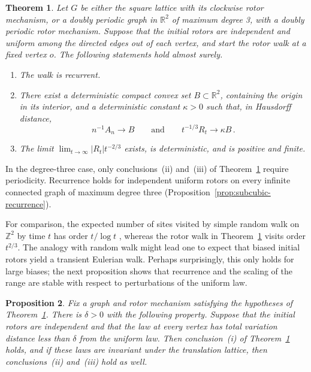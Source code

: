 \documentclass[11pt]{amsart}
\theoremstyle{plain}
\newtheorem{theorem}{Theorem}[section]
\newtheorem{proposition}[theorem]{Proposition}
\theoremstyle{definition}
\newcommand{\Z}{\mathbb Z}
\newcommand{\R}{\mathbb R}
\begin{document}
	\begin{theorem}\label{thm:main}
		Let $G$ be either the square lattice with its clockwise rotor mechanism, or
		a doubly periodic graph in $\R^2$ of maximum degree 3, with a doubly periodic rotor
		mechanism.  Suppose that the initial rotors are independent and uniform among
		the directed edges out of each vertex, and start the rotor walk at a fixed vertex
		$o$.  The following statements hold almost surely.
		
		\begin{enumerate}[label=\textup{(\roman*)}]
			\item The walk is recurrent.
			
			\item There exist a deterministic compact convex set
			$B\subset\R^2$, containing the origin in its interior, and a
			deterministic constant $\kappa>0$ such that, in Hausdorff distance,
			\[
			n^{-1}A_n\longrightarrow B
			\qquad\text{and}\qquad
			t^{-1/3}R_t\longrightarrow\kappa B\, .
			\]
			
			\item The limit $\lim_{t\to\infty}|R_t|t^{-2/3}$ exists, is deterministic,
			and is positive and finite.
		\end{enumerate}
	\end{theorem}
	
	In the degree-three case, only conclusions~\textup{(ii)}
	and~\textup{(iii)} of Theorem~\ref{thm:main} require periodicity.  Recurrence holds for independent uniform rotors on every
	infinite connected graph of maximum degree three
	(Proposition~\ref{prop:subcubic-recurrence}).
	
	For comparison, the expected number of sites visited by simple random walk
	on $\Z^2$ by time $t$ has order $t/\log t$ \citep{DvoretzkyErdos1951},
	whereas the rotor walk in Theorem~\ref{thm:main} visits order $t^{2/3}$.  The analogy with random walk might lead one to expect that biased initial rotors yield a transient Eulerian walk. Perhaps surprisingly, this only holds for large biases; the next proposition  shows that recurrence and the scaling of the range are stable with respect to perturbations of the uniform law.
	
	
	
	\begin{proposition}\label{prop:small-perturbations}
		Fix a graph and rotor mechanism satisfying the hypotheses of
		Theorem~\ref{thm:main}.  There is $\delta>0$ with the following property.
		Suppose that the initial rotors are independent and that the law at every
		vertex has total variation distance less than $\delta$ from the uniform law.
		Then conclusion~\textup{(i)} of Theorem~\ref{thm:main} holds, and if these
		laws are invariant under the translation lattice, then
		conclusions~\textup{(ii)} and~\textup{(iii)} hold as well.
	\end{proposition}
	
\end{document}
